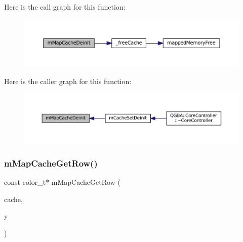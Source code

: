 Here is the call graph for this function\+:
\nopagebreak
\begin{figure}[H]
\begin{center}
\leavevmode
\includegraphics[width=350pt]{map-cache_8c_a5d53da29354cc88338a70840e6c60971_cgraph}
\end{center}
\end{figure}
Here is the caller graph for this function\+:
\nopagebreak
\begin{figure}[H]
\begin{center}
\leavevmode
\includegraphics[width=350pt]{map-cache_8c_a5d53da29354cc88338a70840e6c60971_icgraph}
\end{center}
\end{figure}
\mbox{\label{map-cache_8c_a90311ee29890fde2be10354bfb527898}} 
\subsubsection{\texorpdfstring{m\+Map\+Cache\+Get\+Row()}{mMapCacheGetRow()}}
{\footnotesize\ttfamily const color\+\_\+t$\ast$ m\+Map\+Cache\+Get\+Row (\begin{DoxyParamCaption}\item[{struct m\+Map\+Cache $\ast$}]{cache,  }\item[{unsigned}]{y }\end{DoxyParamCaption})}

\mbox{\label{map-cache_8c_a29d009ada615c07ef3ad61a09b0e2625}} 
